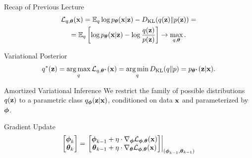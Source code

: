 \documentclass{beamer}
\begin{document}
\begin{frame}{Recap of Previous Lecture}
	\vspace{-0.5cm}
	\begin{multline*}
		\mathcal{L}_{q, \boldsymbol{\theta}}(\mathbf{x})  =  \mathbb{E}_{q} \log p_{\boldsymbol{\theta}}(\mathbf{x} | \mathbf{z}) - D_\mathrm{KL} (q(\mathbf{z}) \| p(\mathbf{z})) = \\ = \mathbb{E}_q \left[ \log p_{\boldsymbol{\theta}}(\mathbf{x} | \mathbf{z}) - \log \frac{q(\mathbf{z})}{p(\mathbf{z})} \right] \rightarrow \max_{q, \boldsymbol{\theta}}.
	\end{multline*}
	\vspace{-0.5cm}
	\begin{block}{Variational Posterior}
		\vspace{-0.3cm}
		\[
			q^*(\mathbf{z}) = \operatorname*{arg\,max}_q \mathcal{L}_{q, \boldsymbol{\theta}^*}(\mathbf{x}) = \operatorname*{arg\,min}_q D_\mathrm{KL}(q \| p) = p_{\boldsymbol{\theta}^*}(\mathbf{z}| \mathbf{x}).
		\]
		\vspace{-0.5cm}
	\end{block}
	\begin{block}{Amortized Variational Inference}
			We restrict the family of possible distributions $q(\mathbf{z})$ to a parametric class $q_{\boldsymbol{\phi}}(\mathbf{z}| \mathbf{x})$, {\color{teal}conditioned on data $\mathbf{x}$} and {\color{violet}parameterized by $\boldsymbol{\phi}$}.
	\end{block}
	\begin{block}{Gradient Update}
		\[
			\begin{bmatrix}
				\boldsymbol{\phi}_k \\
				\boldsymbol{\theta}_k
			\end{bmatrix}
			= \left.
			\begin{bmatrix}
				\boldsymbol{\phi}_{k-1} + \eta \cdot \nabla_{\boldsymbol{\phi}} \mathcal{L}_{\boldsymbol{\phi}, \boldsymbol{\theta}}(\mathbf{x}) \\
				\boldsymbol{\theta}_{k-1} + \eta \cdot \nabla_{\boldsymbol{\theta}} \mathcal{L}_{\boldsymbol{\phi}, \boldsymbol{\theta}}(\mathbf{x})
			\end{bmatrix}
			\right|_{(\boldsymbol{\phi}_{k-1}, \boldsymbol{\theta}_{k-1})}
		\]
	\end{block}
\end{frame}
\end{document}
